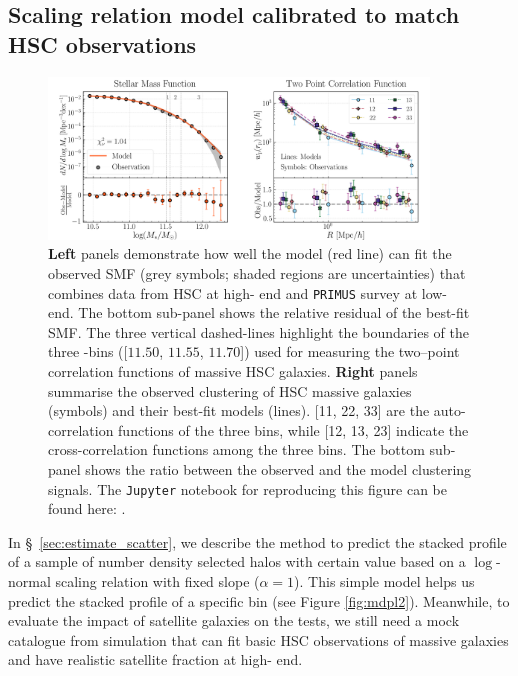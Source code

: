 \documentclass[fleqn,usenatbib,useAMS]{mnras}
\begin{document}
\begin{CJK*}{UTF8}{gbsn}
\section{Scaling relation model calibrated to match HSC observations}
    \label{app:hsc_model}

\begin{figure}
  \centering
  \includegraphics[width=0.9\textwidth]{figure/fig_B1}
  \caption{
      \textbf{Left} panels demonstrate how well the model (red line) can fit the observed SMF
      (grey symbols; shaded regions are uncertainties) that combines data from HSC at high-\mstar{}
      end and \texttt{PRIMUS} survey at low-\mstar{} end.
      The bottom sub-panel shows the relative residual of the best-fit SMF.
      The three vertical dashed-lines highlight the \mstar{} boundaries of the three \mstar{}-bins
      ([$11.50$, $11.55$, $11.70$]) used for measuring the two--point correlation functions of massive
      HSC galaxies.
      \textbf{Right} panels summarise the observed clustering of HSC massive galaxies (symbols)
      and their best-fit models (lines).
      [11, 22, 33] are the auto-correlation functions of the three \mstar{} bins, while
      [12, 13, 23] indicate the cross-correlation functions among the three bins.
      The bottom sub-panel shows the ratio between the observed and the model clustering signals.
        The \texttt{Jupyter} notebook for reproducing this figure can be found here:
        \href{https://github.com/dr-guangtou/jianbing/blob/master/notebooks/figure/figB1.ipynb}{\faGithub}.
    }
  \label{fig:best_mock}
\end{figure}

    In \S\ \ref{sec:estimate_scatter}, we describe the method to predict the stacked \dsigma{}
    profile of a sample of number density selected halos with certain \scatterMhaloObsSym{} value
    based on a $\log$-normal scaling relation with fixed slope ($\alpha=1$).
    This simple model helps us predict the stacked \dsigma{} profile of a specific \topn{} bin
    (see Figure \ref{fig:mdpl2}).
    Meanwhile, to evaluate the impact of satellite galaxies on the \topn{} tests, we still need
    a mock catalogue from simulation that can fit basic HSC observations of massive galaxies and
    have realistic satellite fraction at high-\mstar{} end.


\end{CJK*}
\end{document}
